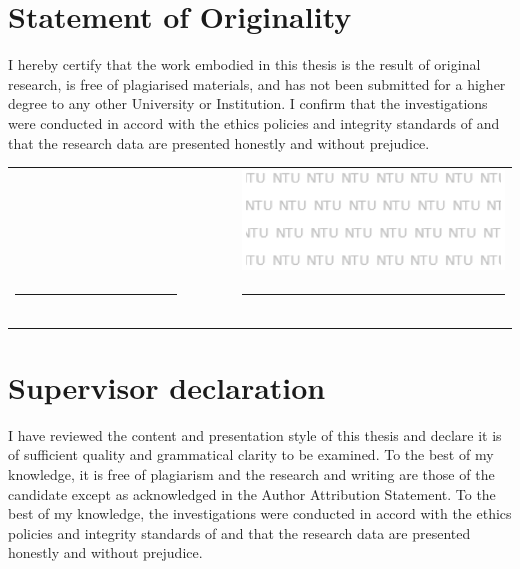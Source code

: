 
\newcommand*{\signaturetable}[1][default]{
    \begingroup
    \noindent
    \renewcommand{\arraystretch}{0} %
    \begin{tabular}{p{0.35\linewidth}p{0.1\linewidth}p{0.55\linewidth}}
        \makecell{\submissiondate \vspace{0.2cm}} &  & \includegraphics[width=\linewidth]{images/logos/ase_watermark.png} \\
        \hrule                                    &  & \hrule                                                             \\
        \makecell[t]{Date}                        &  & \makecell[t]{ #1 }                                                 \\
    \end{tabular}
    \endgroup
}

\chapter*{Statement of Originality}
I hereby certify that the work embodied in this thesis is the result of original research, is free of plagiarised materials, and has not been submitted for a higher degree to any other University or Institution. I confirm that the investigations were conducted in accord with the ethics policies and integrity standards of \schoolname and that the research data are presented honestly and without prejudice.
\vfill

\signaturetable[{
            \authorname \\ \deptname \\ \schoolname
        }]
\vspace{2cm}

\chapter*{Supervisor declaration}

I have reviewed the content and presentation style of this thesis and declare it is of sufficient quality and grammatical clarity to be examined.  To the best of my knowledge, it is free of plagiarism and the research and writing are those of the candidate except as acknowledged in the Author Attribution Statement. To the best of my knowledge, the investigations were conducted in accord with the ethics policies and integrity standards of \schoolname and that the research data are presented honestly and without prejudice.
\vfill


